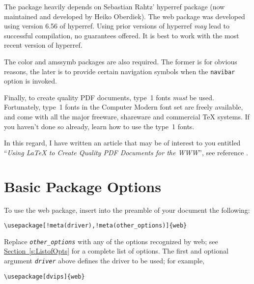 \documentclass{article}
\def\meta#1{\textit{\texttt{#1}}}
\let\pkg\textsf
\edef\amtIndent{\the\parindent}
\begin{document}
{The package heavily depends on Sebastian Rahtz' \pkg{hyperref}
package (now maintained and developed by Heiko Oberdiek). The
\pkg{web} package was developed using version 6.56 of
\pkg{hyperref}. Using prior versions of \pkg{hyperref}
\emph{may} lead to successful compilation, no guarantees offered.
It is best to work with the most recent version of
\pkg{hyperref}.

The \textsf{color} and \textsf{amssymb} packages are also
required. The former is for obvious reasons, the later is to
provide certain navigation symbols when the \texttt{navibar}
option is invoked.

Finally, to create quality PDF documents, type~1 fonts \emph{must}
be used. Fortunately, type~1 fonts in the Computer Modern font set
are freely available, and come with all the major
freeware, shareware and commercial \TeX{} systems. If you haven't
done so already, learn how to use the type~1 fonts.

In this regard, I have written an article that may be of interest
to you entitled ``\textit{Using \LaTeX{} to Create Quality PDF Documents
for the WWW}'', see reference \cite{article:Story:LaTeX}.

\section{Basic Package Options}

To use the \pkg{web} package, insert into the preamble of
your document the following:
\begin{Verbatim}[xleftmargin=\amtIndent,commandchars=!()]
\usepackage[!meta(driver),!meta(other_options)]{web}
\end{Verbatim}
\noindent Replace \meta{other\_options} with any of the options recognized by
\pkg{web}; see \hyperref[s:ListofOpts]{Section~\ref*{s:ListofOpts}}
for a complete list of options. The first and optional argument
\meta{driver} above defines the driver to be used; for
example,
\begin{Verbatim}[xleftmargin=\amtIndent]
\usepackage[dvips]{web}
\end{Verbatim}

}
\end{document}
